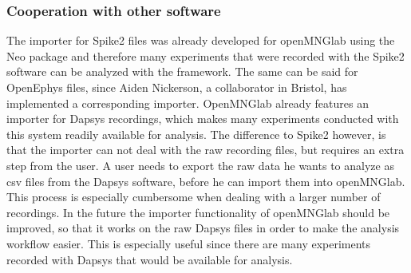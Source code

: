 






\subsubsection{Cooperation with other software}
The importer for Spike2 files was already developed for openMNGlab using the Neo package and therefore many experiments that were recorded with the Spike2 software can be analyzed with the framework. The same can be said for OpenEphys files, since Aiden Nickerson, a collaborator in Bristol, has implemented a corresponding importer.
OpenMNGlab already features an importer for Dapsys recordings, which makes many experiments conducted with this system readily available for analysis.
The difference to Spike2 however, is that the importer can not deal with the raw recording files, but requires an extra step from the user. A user needs to export the raw data he wants to analyze as csv files from the Dapsys software, before he can import them into openMNGlab. This process is especially cumbersome when dealing with a larger number of recordings. In the future the importer functionality of openMNGlab should be improved, so that it works on the raw Dapsys files in order to make the analysis workflow easier. This is especially useful since there are many experiments recorded with Dapsys that would be available for analysis.

